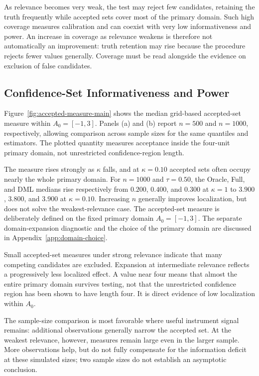 As relevance becomes very weak, the test may reject few candidates, retaining the truth frequently while accepted sets cover most of the primary domain. Such high coverage measures calibration and can coexist with very low informativeness and power. An increase in coverage as relevance weakens is therefore not automatically an improvement: truth retention may rise because the procedure rejects fewer values generally. Coverage must be read alongside the evidence on exclusion of false candidates.

\subsection{Confidence-Set Informativeness and Power}

Figure~\ref{fig:accepted-measure-main} shows the median grid-based accepted-set measure within $A_0=[-1,3]$. Panels (a) and (b) report $n=500$ and $n=1000$, respectively, allowing comparison across sample sizes for the same quantiles and estimators. The plotted quantity measures acceptance inside the four-unit primary domain, not unrestricted confidence-region length.



The measure rises strongly as $\kappa$ falls, and at $\kappa=0.10$ accepted sets often occupy nearly the whole primary domain. For $n=1000$ and $\tau=0.50$, the Oracle, Full, and DML medians rise respectively from $0.200$, $0.400$, and $0.300$ at $\kappa=1$ to $3.900$, $3.800$, and $3.900$ at $\kappa=0.10$. Increasing $n$ generally improves localization, but does not solve the weakest-relevance case. The accepted-set measure is deliberately defined on the fixed primary domain $A_0=[-1,3]$. The separate domain-expansion diagnostic and the choice of the primary domain are discussed in Appendix~\ref{app:domain-choice}.

Small accepted-set measures under strong relevance indicate that many competing candidates are excluded. Expansion at intermediate relevance reflects a progressively less localized effect. A value near four means that almost the entire primary domain survives testing, not that the unrestricted confidence region has been shown to have length four. It is direct evidence of low localization within $A_0$.

The sample-size comparison is most favorable where useful instrument signal remains: additional observations generally narrow the accepted set. At the weakest relevance, however, measures remain large even in the larger sample. More observations help, but do not fully compensate for the information deficit at these simulated sizes; two sample sizes do not establish an asymptotic conclusion.

